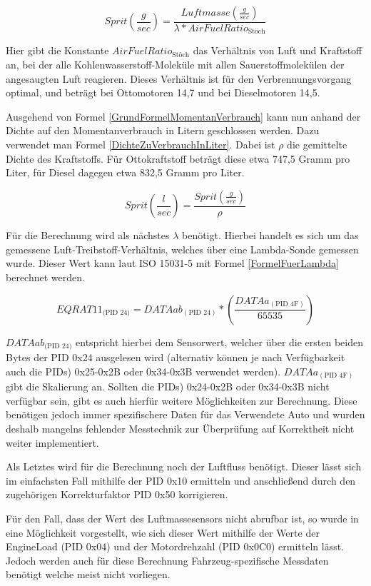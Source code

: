 \begin{equation}
\label{GrundFormelMomentanVerbrauch}
Sprit(\frac{g}{sec}) = \frac{Luftmasse(\frac{g}{sec})}{\lambda*AirFuelRatio_\text{Stöch}}
\end{equation}

Hier gibt die Konstante $AirFuelRatio_\text{Stöch}$ das Verhältnis von Luft und Kraftstoff an, bei der alle
Kohlenwasserstoff-Moleküle mit allen Sauerstoffmolekülen der angesaugten Luft reagieren. Dieses
Verhältnis ist für den Verbrennungsvorgang optimal, und beträgt bei Ottomotoren 14,7 und bei
Dieselmotoren 14,5.

Ausgehend von Formel \ref{GrundFormelMomentanVerbrauch} kann nun anhand der Dichte auf den Momentanverbrauch in Litern geschlossen werden. Dazu verwendet man Formel \ref{DichteZuVerbrauchInLiter}. Dabei ist $\rho$ die gemittelte Dichte des Kraftstoffs. Für Ottokraftstoff beträgt diese etwa 747,5
Gramm pro Liter, für Diesel dagegen etwa 832,5 Gramm pro Liter\cite{Aral2018}. 

\begin{equation}
\label{DichteZuVerbrauchInLiter}
Sprit(\frac{l}{sec}) = \frac{Sprit(\frac{g}{sec})}{\rho}
\end{equation}
 
Für die Berechnung wird als nächstes $\lambda$ benötigt. Hierbei handelt es sich um das gemessene Luft-Treibstoff-Verhältnis, welches über eine Lambda-Sonde gemessen wurde. Dieser Wert kann laut ISO 15031-5 mit Formel \ref{FormelFuerLambda} berechnet werden.

\begin{equation}
\label{FormelFuerLambda}
EQRAT 11_\text{(PID 24)}=DATAab_{(\text{PID 24})}*(\frac{DATAa_{(\text{PID 4F})}}{65535})
\end{equation}

$DATAab_{\text{(PID 24)}}$ entspricht hierbei dem Sensorwert, welcher über die ersten beiden Bytes der \ac{PID} 0x24 ausgelesen wird (alternativ können je nach Verfügbarkeit auch die \acp{PID}) 0x25-0x2B oder 0x34-0x3B verwendet werden).
\newline
$DATAa_{(\text{PID 4F})}$ gibt die Skalierung an.
\newline
Sollten die \acp{PID}) 0x24-0x2B oder 0x34-0x3B nicht verfügbar sein, gibt es auch hierfür weitere Möglichkeiten zur Berechnung. Diese benötigen jedoch immer spezifischere Daten für das Verwendete Auto und wurden deshalb mangelns fehlender Messtechnik zur Überprüfung auf Korrektheit nicht weiter implementiert.

Als Letztes wird für die Berechnung noch der Luftfluss benötigt. Dieser lässt sich im einfachsten Fall mithilfe der \ac{PID} 0x10 ermitteln und anschließend durch den zugehörigen Korrekturfaktor \ac{PID} 0x50 korrigieren.

Für den Fall, dass der Wert des Luftmassesensors nicht abrufbar ist, so wurde in \cite{obdConsumption} eine Möglichkeit vorgestellt, wie sich dieser Wert mithilfe der Werte der EngineLoad (\ac{PID} 0x04) und der Motordrehzahl (\ac{PID} 0x0C0) ermitteln lässt. Jedoch werden auch für diese Berechnung Fahrzeug-spezifische Messdaten benötigt welche meist nicht vorliegen.

 
 
 
 
